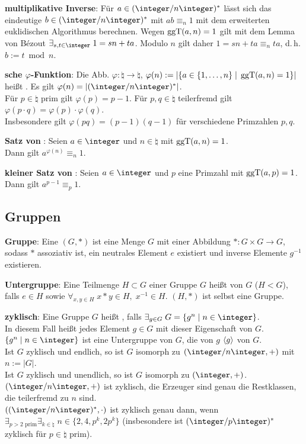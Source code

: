 \textbf{multiplikative Inverse}:
Für $a \in (\ZnZ)^\ast$ lässt sich
das eindeutige $b \in (\ZnZ)^\ast$ mit $ab \equiv_n 1$ mit dem
erweiterten euklidischen Algorithmus berechnen.
Wegen $\operatorname{ggT}(a, n) = 1$ gilt mit dem Lemma von Bézout $\exists_{s, t \in \integer}\; 1 = sn + ta$.
Modulo $n$ gilt daher $1 = sn + ta \equiv_n ta$, d.\,h. $b := t \bmod n$.

\textbf{sche $\varphi$-Funktion}:
Die Abb. $\varphi\colon \natural \rightarrow \natural$,
$\varphi(n) := \left|\{a \in \{1, \dotsc, n\} \;|\; \operatorname{ggT}(a, n) = 1\}\right|$
heißt .
Es gilt $\varphi(n) = |(\ZnZ)^\ast|$.\\
Für $p \in \natural$ prim gilt $\varphi(p) = p - 1$.
Für $p, q \in \natural$ teilerfremd gilt $\varphi(p \cdot q) = \varphi(p) \cdot \varphi(q)$.\\
Insbesondere gilt $\varphi(pq) = (p-1)(q-1)$ für verschiedene Primzahlen $p, q$.

\textbf{Satz von }:
Seien $a \in \integer$ und $n \in \natural$ mit $\operatorname{ggT}(a, n) = 1$.\\
Dann gilt $a^{\varphi(n)} \equiv_n 1$.

\textbf{kleiner Satz von }:
Seien $a \in \integer$ und $p$ eine Primzahl mit $\operatorname{ggT}(a, p) = 1$.\\
Dann gilt $a^{p-1} \equiv_p 1$.

\subsection{%
    Gruppen%
}

\textbf{Gruppe}:
Eine  $(G, \ast)$ ist eine Menge $G$ mit einer Abbildung
$\ast\colon G \times G \rightarrow G$, sodass
$\ast$ assoziativ ist,
ein neutrales Element $e$ existiert und
inverse Elemente $g^{-1}$ existieren.

\textbf{Untergruppe}:
Eine Teilmenge $H \subset G$ einer Gruppe $G$ heißt  von $G$
($H < G$),
falls $e \in H$ sowie $\forall_{x, y \in H}\; x \ast y \in H,\; x^{-1} \in H$.
$(H, \ast)$ ist selbst eine Gruppe.

\textbf{zyklisch}:
Eine Gruppe $G$ heißt , falls
$\exists_{g \in G}\; G = \{g^n \;|\; n \in \integer\}$.\\
In diesem Fall heißt jedes Element $g \in G$ mit dieser Eigenschaft  von $G$.\\
$\{g^n \;|\; n \in \integer\}$ ist eine Untergruppe von $G$, die von $g$
 $\langle g\rangle$ von $G$.\\
Ist $G$ zyklisch und endlich, so ist $G$ isomorph zu $(\ZnZ, +)$ mit $n := |G|$.\\
Ist $G$ zyklisch und unendlich, so ist $G$ isomorph zu $(\integer, +)$.\\
$(\ZnZ, +)$ ist zyklisch, die Erzeuger sind genau die Restklassen, die teilerfremd zu $n$ sind.\\
$((\ZnZ)^\ast, \cdot)$ ist zyklisch genau dann, wenn
$\exists_{p > 2 \text{ prim}} \exists_{k \in \natural}\; n \in \{2, 4, p^k, 2p^k\}$
(insbesondere ist $(\ZpZ)^\ast$ zyklisch für $p \in \natural$ prim).


